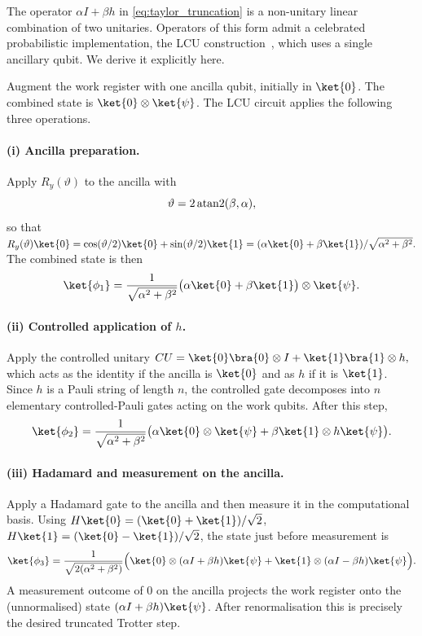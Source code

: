 The operator $\alpha I + \beta h$ in \cref{eq:taylor_truncation} is a
non-unitary linear combination of two unitaries. Operators of this form
admit a celebrated probabilistic implementation, the LCU
construction~\cite{childs2012}, which uses a single ancillary qubit. We
derive it explicitly here.

Augment the work register with one ancilla qubit, initially in $\ket{0}$.
The combined state is $\ket{0}\otimes\ket{\psi}$. The LCU circuit
applies the following three operations.

\paragraph{(i) Ancilla preparation.}
Apply $R_y(\vartheta)$ to the ancilla with
\begin{equation}
  \label{eq:lcu_angle}
  \vartheta = 2\operatorname{atan2}(\beta,\alpha),
\end{equation}
so that
\(
  R_y(\vartheta)\ket{0}
  = \cos(\vartheta/2)\ket{0} + \sin(\vartheta/2)\ket{1}
  = (\alpha\ket{0} + \beta\ket{1})/\sqrt{\alpha^{2}+\beta^{2}}.
\)
The combined state is then
\begin{equation}
  \label{eq:lcu_state1}
  \ket{\phi_1} = \frac{1}{\sqrt{\alpha^{2}+\beta^{2}}}
                 \bigl(\alpha\ket{0} + \beta\ket{1}\bigr)\otimes\ket{\psi}.
\end{equation}

\paragraph{(ii) Controlled application of $h$.}
Apply the controlled unitary
\(
  CU = \ket{0}\bra{0}\otimes I + \ket{1}\bra{1}\otimes h,
\)
which acts as the identity if the ancilla is $\ket{0}$ and as $h$ if it
is $\ket{1}$. Since $h$ is a Pauli string of length $n$, the controlled
gate decomposes into $n$ elementary controlled-Pauli gates acting on the
work qubits. After this step,
\begin{equation}
  \label{eq:lcu_state2}
  \ket{\phi_2}
  = \frac{1}{\sqrt{\alpha^{2}+\beta^{2}}}
    \bigl(\alpha\ket{0}\otimes\ket{\psi}
        + \beta\ket{1}\otimes h\ket{\psi}\bigr).
\end{equation}

\paragraph{(iii) Hadamard and measurement on the ancilla.}
Apply a Hadamard gate to the ancilla and then measure it in the
computational basis. Using $H\ket{0} = (\ket{0}+\ket{1})/\sqrt{2}$,
$H\ket{1} = (\ket{0}-\ket{1})/\sqrt{2}$, the state just before
measurement is
\begin{equation}
  \label{eq:lcu_state3}
  \ket{\phi_3}
  = \frac{1}{\sqrt{2(\alpha^{2}+\beta^{2})}}
    \Bigl(\ket{0}\otimes(\alpha I + \beta h)\ket{\psi}
        + \ket{1}\otimes(\alpha I - \beta h)\ket{\psi}\Bigr).
\end{equation}
A measurement outcome of $0$ on the ancilla projects the work register
onto the (unnormalised) state $(\alpha I + \beta h)\ket{\psi}$. After
renormalisation this is precisely the desired truncated Trotter step.

